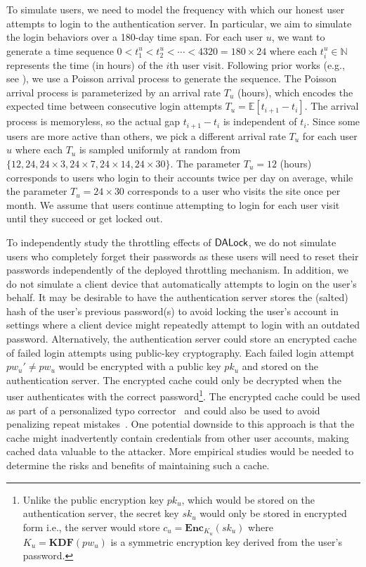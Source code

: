 To simulate users, we need to model the frequency with which our honest user attempts to login to the authentication server. In particular, we aim to simulate the login behaviors over a 180-day time span. For each user $u$, we want to generate a time sequence $0 < t_1^u < t_2^u < \cdots < 4320 = 180\times24$ where each $t_i^u \in \mathbb{N}$ represents the time (in hours) of the $i$th user visit. Following prior works (e.g., see \cite{AC:BloBluDat13,CCS:KogManBon17}), we use a Poisson arrival process to generate the sequence. The Poisson arrival process is parameterized by an arrival rate $T_u$ (hours), which encodes the expected time between consecutive login attempts $T_u = \mathbb{E}[t_{i+1}-t_i]$. The arrival process is memoryless, so the actual gap $t_{i+1}-t_i$  is independent of $t_i$. Since some users are more active than others, we pick a different arrival rate $T_u$ for each user $u$ where each $T_u$ is sampled uniformly at random from $\{ 12, 24, 24 \times 3, 24 \times 7, 24 \times 14, 24 \times 30\}$. The parameter $T_u = 12$ (hours) corresponds to users who login to their accounts twice per day on average, while the parameter $T_u = 24 \times 30$ corresponds to a user who visits the site once per month. We assume that users continue attempting to login for each user visit until they succeed or get locked out. 

To independently study the throttling effects of $\mathsf{DALock}$, we do not simulate users who completely forget their passwords as these users will need to reset their passwords independently of the deployed throttling mechanism. In addition, we do not simulate a client device that automatically attempts to login on the user's behalf. It may be desirable to have the authentication server stores the (salted) hash of the user’s previous password(s) to avoid locking the user's account in settings where a client device might repeatedly attempt to login with an outdated password. Alternatively, the authentication server could store an encrypted cache of failed login attempts using public-key cryptography. Each failed login attempt $pw_u' \neq pw_u$ would be encrypted with a public key $pk_u$ and stored on the authentication server. The encrypted cache could only be decrypted when the user authenticates with the correct password\footnote{Unlike the public encryption key $pk_u$, which would be stored on the authentication server, the secret key $sk_u$ would only be stored in encrypted form i.e., the server would store $c_u = \mathbf{Enc}_{K_u}(sk_u)$ where $K_u = \mathbf{KDF}(pw_u)$ is a symmetric encryption key derived from the user's password. }. The encrypted cache could be used as part of a personalized typo corrector~\cite{CCS:CWPCR17} and could also be used to avoid penalizing repeat mistakes~\cite{CCS:CWPCR17,EuroSP:THS19}. One potential downside to this approach is that the cache might inadvertently contain credentials from other user accounts, making cached data valuable to the attacker. More empirical studies would be needed to determine the risks and benefits of maintaining such a cache.



